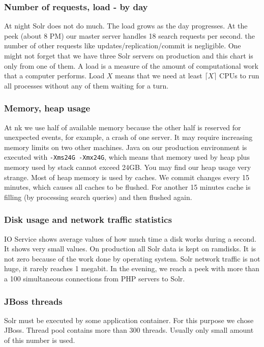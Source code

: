 \documentclass[10pt,a4paper]{article}
\begin{document}
\subsubsection*{Number of requests, load - by day} 
At night Solr does not do much. The load grows as the day progresses. At the peek (about 8 PM) our master server handles 18 search requests per second. the number of other requests like updates/replication/commit is negligible. One might not forget that we have three Solr servers on production and this chart is only from one of them. A load is a measure of the amount of computational work that a computer performs. Load $X$ means that we need at least $\lceil X \rceil$ CPUs to run all processes without any of them waiting for a turn. 

\subsubsection*{Memory, heap usage}
At nk we use half of available memory because the other half is reserved for unexpected events, for example, a crash of one server. It may require increasing memory limits on two other machines. Java on our production environment is executed with \verb|-Xms24G -Xmx24G|, which means that memory used by heap plus memory used by stack cannot exceed 24GB. You may find our heap usage very strange. Most of heap memory is used by caches. We commit changes every 15 minutes, which causes all caches to be flushed. For another 15 minutes cache is filling (by processing search queries) and then flushed again.

\subsubsection*{Disk usage and network traffic statistics}
IO Service shows average values of how much time a disk works during a second. It shows very small values. On production all Solr data is kept on ramdisks. It is not zero because of the work done by operating system. Solr network traffic is not huge, it rarely reaches 1 megabit. In the evening, we reach a peek with more than a 100 simultaneous connections from PHP servers to Solr.


\subsubsection*{JBoss threads}
Solr must be executed by some application container. For this purpose we chose JBoss. Thread pool contains more than 300 threads. Usually only small amount of this number is used.
\end{document}
